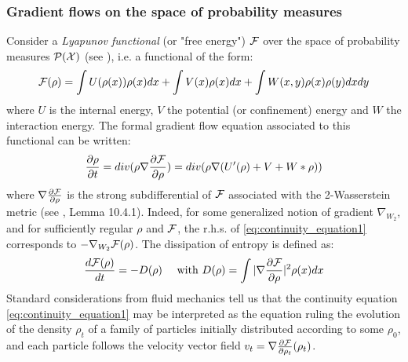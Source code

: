 \subsubsection{Gradient flows on the space of probability measures}\label{sec:gradient_flows_functionals}


Consider a 
\textit{Lyapunov functional} 
(or "free energy") ${{\mathcal F}}$ over the space of probability measures $\mathcal{P}({{\mathcal X}})$
(see \cite{Villani:2004}), 
i.e. a functional of the form:
\begin{equation}\label{eq:lyapunov}
{{\mathcal F}}(\rho)=\int U(\rho(x)) \rho(x)dx + \int V(x)\rho(x)dx + \int W(x,y)\rho(x)\rho(y)dxdy
\end{equation}
where  $U$ is the internal energy, $V$ the potential (or confinement) energy and $W$ the
interaction energy. The formal gradient flow equation associated to this functional can be written:
\begin{equation}\label{eq:continuity_equation1}
\frac{\partial \rho}{\partial t}= div( \rho \nabla \frac{\partial {{\mathcal F}}}{\partial \rho})=div( \rho \nabla (U'(\rho) + V + W * \rho))
\end{equation}
where $\nabla \frac{\partial {{\mathcal F}}}{\partial \rho}$ is the strong subdifferential of ${{\mathcal F}}$ associated with the 2-Wasserstein
metric (see \cite{ambrosio2008gradient}, Lemma 10.4.1). Indeed, for some generalized notion of gradient $\nabla_{W_2}$, and for sufficiently regular $\rho$ and ${{\mathcal F}}$, the r.h.s. of \eqref{eq:continuity_equation1} corresponds to $-\nabla_{W_2}{{\mathcal F}}(\rho)$.
The dissipation of entropy is defined as: 
\begin{align}
       \frac{d {{\mathcal F}}(\rho)}{dt} =-D(\rho) \quad \text{ with } D(\rho)= \int |\nabla \frac{\partial {{\mathcal F}}}{\partial \rho}|^2 \rho(x)dx
\end{align}
Standard considerations from fluid mechanics tell us that the continuity equation \eqref{eq:continuity_equation1} may be interpreted as the equation ruling the evolution of the density $\rho_t$ of a family of particles initially distributed according to some $\rho_0$, and each particle follows the velocity vector field $v_t=\nabla \frac{\partial{{{\mathcal F}}}}{\partial{\rho_t}}(\rho_t)$.

